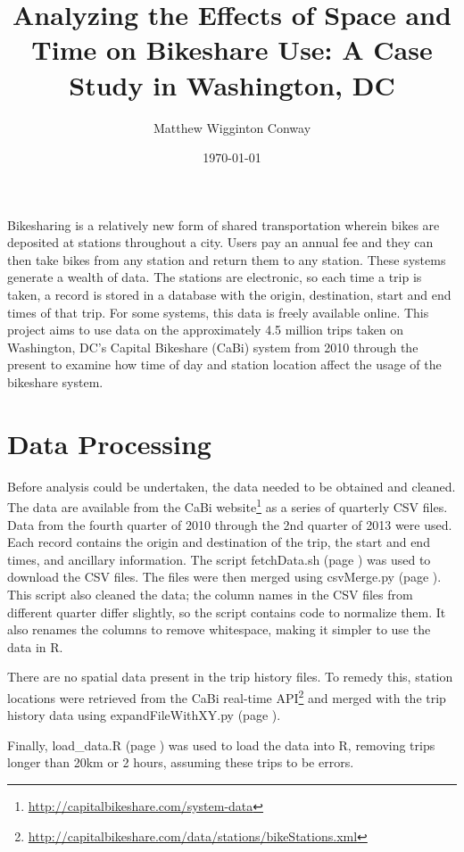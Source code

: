 \documentclass[letterpaper,11pt]{article}
\title{Analyzing the Effects of Space and Time on Bikeshare Use: A Case Study in Washington, DC}
\author{Matthew Wigginton Conway}
\date{\today}
\newcommand{\reflst}[1]{#1 (page \pageref{#1})}
\begin{document}
\fancyhfoffset[E,O]{0pt}
\maketitle

Bikesharing is a relatively new form of shared transportation wherein
bikes are deposited at stations throughout a city. Users pay an annual
fee and they can then take bikes from any station and return them to
any station. These systems generate a wealth of data. The stations are
electronic, so each time a trip is taken, a record is stored in a
database with the origin, destination, start and end times of that
trip. For some systems, this data is freely available online. This
project aims to use data on the approximately 4.5 million trips taken
on Washington, DC's Capital Bikeshare (CaBi) system from 2010 through the
present to examine how time of day and station location affect the
usage of the bikeshare system.

\section{Data Processing}

Before analysis could be undertaken, the data needed to be obtained
and cleaned.  The data are available from the CaBi
website\footnote{\url{http://capitalbikeshare.com/system-data}} as a
series of quarterly CSV files. Data from the fourth quarter of 2010
through the 2nd quarter of 2013 were used. Each record contains the
origin and destination of the trip, the start and end times, and
ancillary information.  The script \reflst{fetchData.sh} was used to
download the CSV files. The files were then merged using
\reflst{csvMerge.py}. This script also cleaned the data; the column
names in the CSV files from different quarter differ slightly, so the script
contains code to normalize them.  It also renames the columns to
remove whitespace, making it simpler to use the data in R.

There are no spatial data present in the trip history files. To remedy
this, station locations were retrieved from the CaBi real-time
API\footnote{\url{http://capitalbikeshare.com/data/stations/bikeStations.xml}}
and merged with the trip history data using
\reflst{expandFileWithXY.py}.

Finally, \reflst{load\string_data.R} was used to load the data into R,
removing trips longer than 20km or 2 hours, assuming these trips to
be errors.
\end{document}
